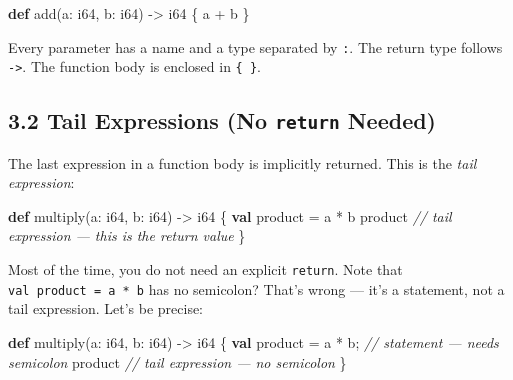 \documentclass[
  english,
]{book}
\newenvironment{Shaded}{\begin{snugshade}}{\end{snugshade}}
\newcommand{\CommentTok}[1]{\textcolor[rgb]{0.42,0.60,0.33}{\textit{#1}}}
\newcommand{\DataTypeTok}[1]{\textcolor[rgb]{0.31,0.79,0.69}{#1}}
\newcommand{\KeywordTok}[1]{\textcolor[rgb]{0.34,0.61,0.84}{\textbf{#1}}}
\newcommand{\NormalTok}[1]{\textcolor[rgb]{0.83,0.83,0.83}{#1}}
\newcommand{\OperatorTok}[1]{\textcolor[rgb]{0.83,0.83,0.83}{#1}}
\begin{document}
\begin{Shaded}
\begin{Highlighting}[]
\KeywordTok{def}\NormalTok{ add(a: }\DataTypeTok{i64}\NormalTok{, b: }\DataTypeTok{i64}\NormalTok{) }\OperatorTok{{-}\textgreater{}} \DataTypeTok{i64}\NormalTok{ \{}
\NormalTok{    a }\OperatorTok{+}\NormalTok{ b}
\NormalTok{\}}
\end{Highlighting}
\end{Shaded}

Every parameter has a name and a type separated by \texttt{:}. The
return type follows \texttt{-\textgreater{}}. The function body is
enclosed in \texttt{\{\ \}}.

\subsection{\texorpdfstring{3.2 Tail Expressions (No \texttt{return}
Needed)}{3.2 Tail Expressions (No return Needed)}}\label{tail-expressions-no-return-needed}

The last expression in a function body is implicitly returned. This is
the \emph{tail expression}:

\begin{Shaded}
\begin{Highlighting}[]
\KeywordTok{def}\NormalTok{ multiply(a: }\DataTypeTok{i64}\NormalTok{, b: }\DataTypeTok{i64}\NormalTok{) }\OperatorTok{{-}\textgreater{}} \DataTypeTok{i64}\NormalTok{ \{}
    \KeywordTok{val}\NormalTok{ product }\OperatorTok{=}\NormalTok{ a }\OperatorTok{*}\NormalTok{ b}
\NormalTok{    product          }\CommentTok{// tail expression — this is the return value}
\NormalTok{\}}
\end{Highlighting}
\end{Shaded}

Most of the time, you do not need an explicit \texttt{return}. Note that
\texttt{val\ product\ =\ a\ *\ b} has no semicolon? That's wrong ---
it's a statement, not a tail expression. Let's be precise:

\begin{Shaded}
\begin{Highlighting}[]
\KeywordTok{def}\NormalTok{ multiply(a: }\DataTypeTok{i64}\NormalTok{, b: }\DataTypeTok{i64}\NormalTok{) }\OperatorTok{{-}\textgreater{}} \DataTypeTok{i64}\NormalTok{ \{}
    \KeywordTok{val}\NormalTok{ product }\OperatorTok{=}\NormalTok{ a }\OperatorTok{*}\NormalTok{ b;   }\CommentTok{// statement — needs semicolon}
\NormalTok{    product                }\CommentTok{// tail expression — no semicolon}
\NormalTok{\}}
\end{Highlighting}
\end{Shaded}
\end{document}
